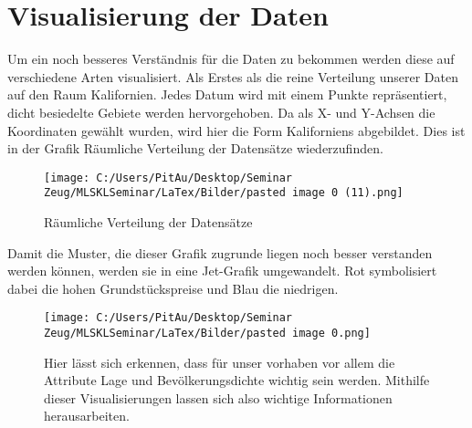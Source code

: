 \section{Visualisierung der Daten}
\label{visualisierungDerDaten}
Um ein noch besseres Verständnis für die Daten zu bekommen werden diese auf verschiedene Arten visualisiert. Als Erstes als die reine Verteilung unserer Daten auf den Raum Kalifornien. Jedes Datum wird mit einem Punkte repräsentiert, dicht besiedelte Gebiete werden hervorgehoben. Da als X- und Y-Achsen die Koordinaten gewählt wurden, wird hier die Form Kaliforniens abgebildet. Dies ist in der Grafik Räumliche Verteilung der Datensätze wiederzufinden.
\begin{figure}
	\texttt{[image: C:/Users/PitAu/Desktop/Seminar Zeug/MLSKLSeminar/LaTex/Bilder/pasted image 0 (11).png]}
	\caption{Räumliche Verteilung der Datensätze}
\end{figure}

Damit die Muster, die dieser Grafik zugrunde liegen noch besser verstanden werden können, werden sie in eine Jet-Grafik umgewandelt. Rot symbolisiert dabei die hohen Grundstückspreise und Blau die niedrigen.

\begin{figure}
	\texttt{[image: C:/Users/PitAu/Desktop/Seminar Zeug/MLSKLSeminar/LaTex/Bilder/pasted image 0.png]}
	\caption{Hier lässt sich erkennen, dass für unser vorhaben vor allem die Attribute Lage und Bevölkerungsdichte wichtig sein werden. Mithilfe dieser Visualisierungen lassen sich also wichtige Informationen herausarbeiten.
}
\end{figure}


